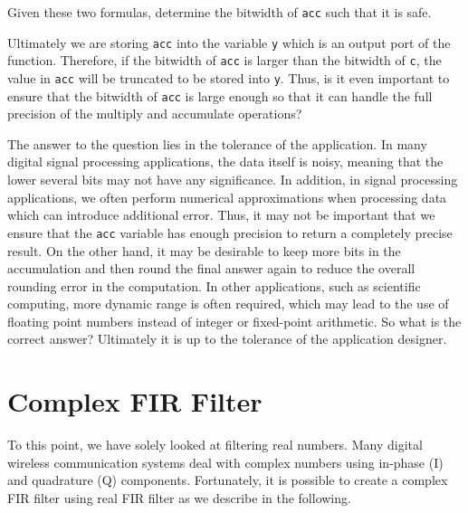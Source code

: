 \begin{exercise}
Given these two formulas, determine the bitwidth of \lstinline{acc} such that it is safe.
\end{exercise}

Ultimately we are storing \lstinline{acc} into the variable \lstinline{y} which is an output port of the function. Therefore, if the bitwidth of \lstinline{acc} is larger than the bitwidth of \lstinline{c}, the value in \lstinline{acc} will be truncated to be stored into \lstinline{y}. Thus, is it even important to ensure that the bitwidth of \lstinline{acc} is large enough so that it can handle the full precision of the multiply and accumulate operations? 

The answer to the question lies in the tolerance of the application. In many digital signal processing applications, the data itself is noisy, meaning that the lower several bits may not have any significance. In addition, in signal processing applications, we often perform numerical approximations when processing data which can introduce additional error. Thus, it may not be important that we ensure that the \lstinline{acc} variable has enough precision to return a completely precise result.  On the other hand, it may be desirable to keep more bits in the accumulation and then round the final answer again to reduce the overall rounding error in the computation. In other applications, such as scientific computing, more dynamic range is often required, which may lead to the use of floating point numbers instead of integer or fixed-point arithmetic. So what is the correct answer? Ultimately it is up to the tolerance of the application designer.



\section{Complex FIR Filter}


To this point, we have solely looked at filtering real numbers. Many digital wireless communication systems deal with complex numbers using in-phase (I) and quadrature (Q) components. Fortunately, it is possible to create a complex FIR filter using real FIR filter as we describe in the following.


